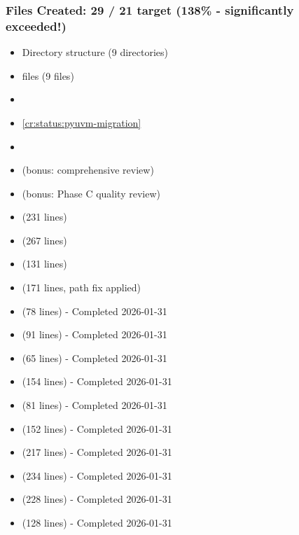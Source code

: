 \subsubsection{Files Created: 29 / 21 target (138\% - significantly
exceeded!)}\label{cr:status:pyuvm-migration:files-created-29-21-target-138-significantly-exceeded}

\begin{record}

\begin{itemize}
\tightlist
\item[$\boxtimes$]
  Directory structure (9 directories)
\item[$\boxtimes$]
   files (9 files)
\item[$\boxtimes$]
\item[$\boxtimes$]
  \cref{cr:status:pyuvm-migration}
\item[$\boxtimes$]
\item[$\boxtimes$]
   (bonus: comprehensive
  review)
\item[$\boxtimes$]
   (bonus: Phase C quality
  review)
\item[$\boxtimes$]
   (231 lines)
\item[$\boxtimes$]
   (267 lines)
\item[$\boxtimes$]
   (131 lines)
\item[$\boxtimes$]
   (171 lines, path fix
  applied)
\item[$\boxtimes$]
   (78 lines) - Completed
  2026-01-31
\item[$\boxtimes$]
   (91 lines) - Completed
  2026-01-31
\item[$\boxtimes$]
   (65 lines) -
  Completed 2026-01-31
\item[$\boxtimes$]
   (154 lines) - Completed 2026-01-31
\item[$\boxtimes$]
   (81 lines) - Completed
  2026-01-31
\item[$\boxtimes$]
   (152 lines) -
  Completed 2026-01-31
\item[$\boxtimes$]
   (217 lines) -
  Completed 2026-01-31
\item[$\boxtimes$]
   (234 lines) - Completed 2026-01-31
\item[$\boxtimes$]
   (228 lines) - Completed
  2026-01-31
\item[$\boxtimes$]
   (128 lines) - Completed
  2026-01-31
\end{itemize}


\end{record}
